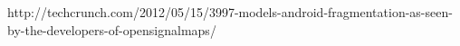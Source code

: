 
http://techcrunch.com/2012/05/15/3997-models-android-fragmentation-as-seen-by-the-developers-of-opensignalmaps/